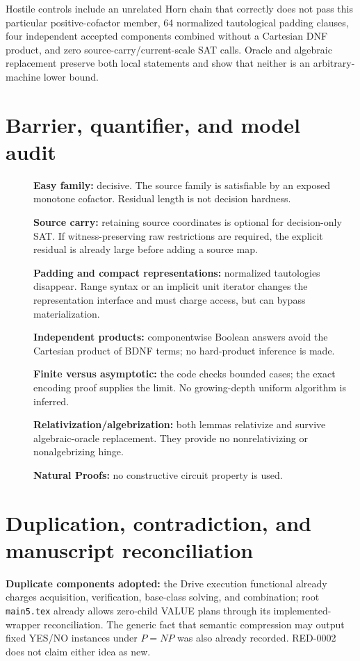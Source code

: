 \documentclass[11pt]{article}
\begin{document}
Hostile controls include an unrelated Horn chain that correctly does not
pass this particular positive-cofactor member, 64 normalized tautological
padding clauses, four independent accepted components combined without a
Cartesian DNF product, and zero source-carry/current-scale SAT calls.
Oracle and algebraic replacement preserve both local statements and show
that neither is an arbitrary-machine lower bound.

\section{Barrier, quantifier, and model audit}
\begin{description}
\item[] \textbf{Easy family:} decisive.  The source family is satisfiable
by an exposed monotone cofactor.  Residual length is not decision hardness.
\item[] \textbf{Source carry:} retaining source coordinates is optional
for decision-only SAT.  If witness-preserving raw restrictions are required,
the explicit residual is already large before adding a source map.
\item[] \textbf{Padding and compact representations:} normalized
tautologies disappear.  Range syntax or an implicit unit iterator changes
the representation interface and must charge access, but can bypass
materialization.
\item[] \textbf{Independent products:} componentwise Boolean answers avoid
the Cartesian product of BDNF terms; no hard-product inference is made.
\item[] \textbf{Finite versus asymptotic:} the code checks bounded cases;
the exact encoding proof supplies the limit.  No growing-depth uniform
algorithm is inferred.
\item[] \textbf{Relativization/algebrization:} both lemmas relativize and
survive algebraic-oracle replacement.  They provide no nonrelativizing or
nonalgebrizing hinge.
\item[] \textbf{Natural Proofs:} no constructive circuit property is used.
\end{description}

\section{Duplication, contradiction, and manuscript reconciliation}
\textbf{Duplicate components adopted:} the Drive execution functional
already charges acquisition, verification, base-class solving, and
combination; root \texttt{main5.tex} already allows zero-child VALUE plans
through its implemented-wrapper reconciliation.  The generic fact that
semantic compression may output fixed YES/NO instances under $P=NP$ was also
already recorded.  RED-0002 does not claim either idea as new.
\end{document}
